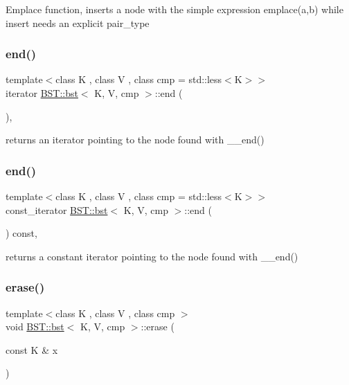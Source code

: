 Emplace function, inserts a node with the simple expression emplace(a,b) while insert needs an explicit pair\+\_\+type \mbox{\label{classBST_1_1bst_a3620e47dedded6930a8b0488fe6ced6b}} 
\subsubsection{\texorpdfstring{end()}{end()}\hspace{0.1cm}{\footnotesize\ttfamily [1/2]}}
{\footnotesize\ttfamily template$<$class K , class V , class cmp  = std\+::less$<$\+K$>$$>$ \\
iterator \hyperlink{classBST_1_1bst}{B\+S\+T\+::bst}$<$ K, V, cmp $>$\+::end (\begin{DoxyParamCaption}{ }\end{DoxyParamCaption})\hspace{0.3cm}{\ttfamily [inline]}, {\ttfamily [noexcept]}}

returns an iterator pointing to the node found with \+\_\+\+\_\+end() \mbox{\label{classBST_1_1bst_acd7c23bcd5cf4f947ce2c0ac88fe646b}} 
\subsubsection{\texorpdfstring{end()}{end()}\hspace{0.1cm}{\footnotesize\ttfamily [2/2]}}
{\footnotesize\ttfamily template$<$class K , class V , class cmp  = std\+::less$<$\+K$>$$>$ \\
const\+\_\+iterator \hyperlink{classBST_1_1bst}{B\+S\+T\+::bst}$<$ K, V, cmp $>$\+::end (\begin{DoxyParamCaption}{ }\end{DoxyParamCaption}) const\hspace{0.3cm}{\ttfamily [inline]}, {\ttfamily [noexcept]}}

returns a constant iterator pointing to the node found with \+\_\+\+\_\+end() \mbox{\label{classBST_1_1bst_a6cd8cd1e40106c21145ae0949159bd34}} 
\subsubsection{\texorpdfstring{erase()}{erase()}}
{\footnotesize\ttfamily template$<$class K , class V , class cmp $>$ \\
void \hyperlink{classBST_1_1bst}{B\+S\+T\+::bst}$<$ K, V, cmp $>$\+::erase (\begin{DoxyParamCaption}\item[{const K \&}]{x }\end{DoxyParamCaption})}

